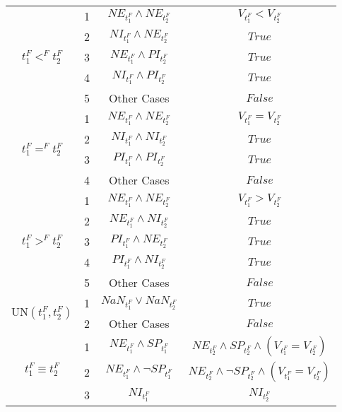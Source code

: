 \documentclass[12pt]{article}
\begin{document}
\begin{tabular}{|c|c|c|c|}
 \hline
 \multirow{5}{2.5cm}{$t_1^F <^F t_2^F$}
 & 1 & $NE_{t_1^F} \wedge NE_{t_2^F}$ & $V_{t_1^F} < V_{t_2^F}$ \\ \cline{2-4}
 & 2 & $NI_{t_1^F} \wedge NE_{t_2^F}$ & $True$                  \\ \cline{2-4}
 & 3 & $NE_{t_1^F} \wedge PI_{t_2^F}$ & $True$                  \\ \cline{2-4}
 & 4 & $NI_{t_1^F} \wedge PI_{t_2^F}$ & $True$                  \\ \cline{2-4}
 & 5 & Other Cases & $False$                                    \\ \cline{2-4}
 \hline
 \multirow{4}{2.5cm}{$t_1^F =^F t_2^F$}
 & 1 & $NE_{t_1^F} \wedge NE_{t_2^F}$ & $V_{t_1^F} = V_{t_2^F}$ \\ \cline{2-4}
 & 2 & $NI_{t_1^F} \wedge NI_{t_2^F}$ & $True$                  \\ \cline{2-4}
 & 3 & $PI_{t_1^F} \wedge PI_{t_2^F}$ & $True$                  \\ \cline{2-4}
 & 4 & Other Cases & $False$                                    \\ \cline{2-4}
 \hline
 \multirow{5}{2.5cm}{$t_1^F > ^F t_2^F$}
 & 1 & $NE_{t_1^F} \wedge NE_{t_2^F}$ & $V_{t_1^F} > V_{t_2^F}$ \\ \cline{2-4}
 & 2 & $NE_{t_1^F} \wedge NI_{t_2^F}$ & $True$                  \\ \cline{2-4}
 & 3 & $PI_{t_1^F} \wedge NE_{t_2^F}$ & $True$                  \\ \cline{2-4}
 & 4 & $PI_{t_1^F} \wedge NI_{t_2^F}$ & $True$                  \\ \cline{2-4}
 & 5 & Other Cases & $False$                                    \\ \cline{2-4}
 \hline
 \multirow{2}{2.5cm}{$\text{UN}(t_1^F, t_2^F)$}
 & 1 & $NaN_{t_1^F} \vee NaN_{t_2^F}$ & $True$                  \\ \cline{2-4}
 & 2 & Other Cases & $False$                                    \\ \cline{2-4}
 \hline
 \multirow{4}{2.5cm}{$t_1^F \equiv t_2^F$}
 & 1 & $NE_{t_1^F} \wedge SP_{t_1^F} $ & $NE_{t_2^F} \wedge SP_{t_2^F} \wedge (V_{t_1^F} = V_{t_2^F})$            \\ \cline{2-4}
 & 2 & $NE_{t_1^F} \wedge \neg SP_{t_1^F} $ & $NE_{t_2^F} \wedge \neg SP_{t_2^F} \wedge (V_{t_1^F} = V_{t_2^F})$            \\ \cline{2-4}
 & 3 & $NI_{t_1^F}$ & $NI_{t_2^F}$                              \\ \cline{2-4}

\end{tabular}
\end{document}
